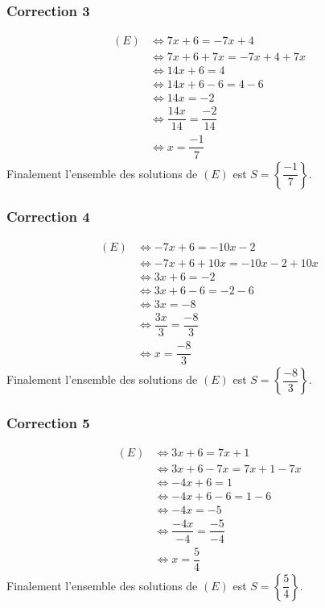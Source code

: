 \documentclass[15pt, mathserif]{beamer}
\begin{document}
\begin{frame}
\vspace{-10mm}
	\frametitle{Correction 3}
	\begin{align*} (E)& \Leftrightarrow 7x+6=-7x+4\\
		&\Leftrightarrow 7x+6+7x=-7x+4+7x\\
		&\Leftrightarrow 14x+6=4\\
		&\Leftrightarrow 14x+6-6=4-6\\
		&\Leftrightarrow 14x=-2\\
		&\Leftrightarrow \dfrac{14x}{14}=\dfrac{-2}{14} \\
		&\Leftrightarrow x= \dfrac{-1}{7}
	\end{align*}
	Finalement l'ensemble des solutions de $(E)$ est $S = \left\{\dfrac{-1}{7}\right\}$.
\end{frame}


\begin{frame}
\vspace{-10mm}
	\frametitle{Correction 4}
	\begin{align*} (E)& \Leftrightarrow -7x+6=-10x-2\\
		&\Leftrightarrow -7x+6+10x=-10x-2+10x\\
		&\Leftrightarrow 3x+6=-2\\
		&\Leftrightarrow 3x+6-6=-2-6\\
		&\Leftrightarrow 3x=-8\\
		&\Leftrightarrow \dfrac{3x}{3}=\dfrac{-8}{3} \\
		&\Leftrightarrow x= \dfrac{-8}{3}
	\end{align*}
	Finalement l'ensemble des solutions de $(E)$ est $S = \left\{\dfrac{-8}{3}\right\}$.
\end{frame}


\begin{frame}
\vspace{-10mm}
	\frametitle{Correction 5}
	\begin{align*} (E)& \Leftrightarrow 3x+6=7x+1\\
		&\Leftrightarrow 3x+6-7x=7x+1-7x\\
		&\Leftrightarrow -4x+6=1\\
		&\Leftrightarrow -4x+6-6=1-6\\
		&\Leftrightarrow -4x=-5\\
		&\Leftrightarrow \dfrac{-4x}{-4}=\dfrac{-5}{-4} \\
		&\Leftrightarrow x= \dfrac{5}{4}
	\end{align*}
	Finalement l'ensemble des solutions de $(E)$ est $S = \left\{\dfrac{5}{4}\right\}$.
\end{frame}
\end{document}
